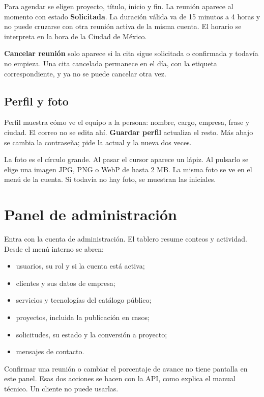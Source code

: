 Para agendar se eligen proyecto, título, inicio y fin. La reunión aparece al
momento con estado \textbf{Solicitada}. La duración válida va de 15 minutos a
4 horas y no puede cruzarse con otra reunión activa de la misma cuenta. El
horario se interpreta en la hora de la Ciudad de México.

\textbf{Cancelar reunión} solo aparece si la cita sigue solicitada o
confirmada y todavía no empieza. Una cita cancelada permanece en el día, con
la etiqueta correspondiente, y ya no se puede cancelar otra vez.

\subsection{Perfil y foto}

Perfil muestra cómo ve el equipo a la persona: nombre, cargo, empresa, frase
y ciudad. El correo no se edita ahí. \textbf{Guardar perfil} actualiza el
resto. Más abajo se cambia la contraseña; pide la actual y la nueva dos veces.

La foto es el círculo grande. Al pasar el cursor aparece un lápiz. Al pulsarlo
se elige una imagen JPG, PNG o WebP de hasta 2 MB. La misma foto se ve en el
menú de la cuenta. Si todavía no hay foto, se muestran las iniciales.

\section{Panel de administración}

Entra con la cuenta de administración. El tablero resume conteos y actividad.
Desde el menú interno se abren:

\begin{itemize}
  \item usuarios, su rol y si la cuenta está activa;
  \item clientes y sus datos de empresa;
  \item servicios y tecnologías del catálogo público;
  \item proyectos, incluida la publicación en casos;
  \item solicitudes, su estado y la conversión a proyecto;
  \item mensajes de contacto.
\end{itemize}

Confirmar una reunión o cambiar el porcentaje de avance no tiene pantalla en
este panel. Esas dos acciones se hacen con la API, como explica el manual
técnico. Un cliente no puede usarlas.


